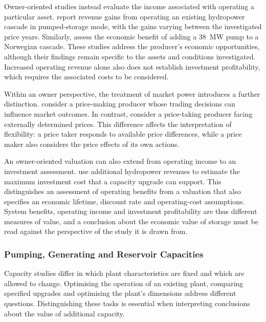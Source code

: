 Owner-oriented studies instead evaluate the income associated with
operating a particular asset. \citet{ak2019quantifying} report revenue
gains from operating an existing hydropower cascade in pumped-storage
mode, with the gains varying between the investigated price years.
Similarly, \citet{alic2023optimal} assess the economic benefit of adding
a \SI{38}{\mega\watt} pump to a Norwegian cascade. These studies address
the producer's economic opportunities, although their findings remain
specific to the assets and conditions investigated. Increased operating
revenue alone also does not establish investment profitability, which
requires the associated costs to be considered.

Within an owner perspective, the treatment of market power introduces a
further distinction. \citet{abgottspon2013stochastic} consider a
price-making producer whose trading decisions can influence market
outcomes. In contrast, \citet{helseth2016} consider a price-taking
producer facing externally determined prices. This difference affects
the interpretation of flexibility: a price taker responds to available
price differences, while a price maker also considers the price effects
of its own actions.

An owner-oriented valuation can also extend from operating income to an
investment assessment. \citet{bore2026assessing} use additional
hydropower revenues to estimate the maximum investment cost that a
capacity upgrade can support. This distinguishes an assessment of
operating benefits from a valuation that also specifies an economic
lifetime, discount rate and operating-cost assumptions. System benefits,
operating income and investment profitability are thus different
measures of value, and a conclusion about the economic value of storage
must be read against the perspective of the study it is drawn from.

\subsubsection{Pumping, Generating and Reservoir Capacities}
\label{sec:lit_capacities}

Capacity studies differ in which plant characteristics are fixed and
which are allowed to change. Optimising the operation of an existing
plant, comparing specified upgrades and optimising the plant's
dimensions address different questions. Distinguishing these tasks is
essential when interpreting conclusions about the value of additional
capacity.

